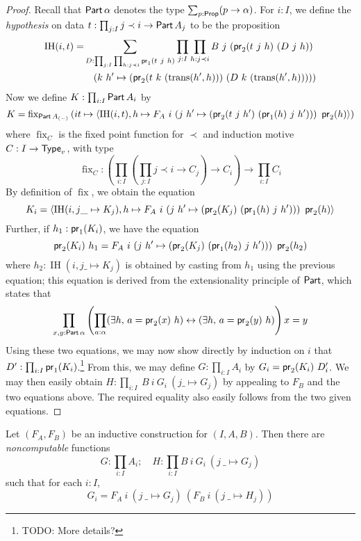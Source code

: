 \begin{proof}
  Recall that \( \operatorname{\mathsf{Part}} \alpha \) denotes the type \( \sum_{p: \mathsf{Prop}} (p \to \alpha) \).
  For \( i : I \), we define the \emph{hypothesis} on data \( t : \prod_{j : I} j \prec i \to \operatorname{\mathsf{Part}} A_j \) to be the proposition
  \begin{align*}
    \operatorname{IH}(i, t) = &\sum_{D : \prod_{j : I} \prod_{h : j \prec i} \pr_1(t\ j\ h)} \prod_{j : I} \prod_{h : j \prec i} B\ j\ (\pr_2(t\ j\ h)\ (D\ j\ h))\\
    &\quad(k\ h' \mapsto (\pr_2(t\ k\ (\operatorname{trans}(h',h)))\ (D\ k\ (\operatorname{trans}(h',h)))))
  \end{align*}
  Now we define \( K : \prod_{i : I} \operatorname{\mathsf{Part}} A_i \) by
  \[ K = \operatorname{fix}_{\Part A_{(-)}} \left( i t \mapsto \left\langle \operatorname{IH}(i, t), h \mapsto F_A\ i\ (j\ h' \mapsto (\pr_2(t\ j\ h')\ (\pr_1(h)\ j\ h')))\ \pr_2(h) \right\rangle \right) \]
  where \( \operatorname{fix}_C \) is the fixed point function for \( \prec \) and induction motive \( C : I \to \mathsf{Type}_v \), with type
  \[ \operatorname{fix}_C : \left( \prod_{i : I} \left( \prod_{j : I} j \prec i \to C_j \right) \to C_i \right) \to \prod_{i : I} C_i \]
  By definition of \( \operatorname{fix} \), we obtain the equation
  \[ K_i = \left\langle \operatorname{IH}(i, j \_ \mapsto K_j), h \mapsto F_A\ i\ (j\ h' \mapsto (\operatorname{\mathsf{pr}}_2(K_j)\ (\operatorname{\mathsf{pr}}_1(h)\ j\ h')))\ \operatorname{\mathsf{pr}}_2(h) \right\rangle \]
  Further, if \( h_1 : \operatorname{\mathsf{pr}}_1(K_i) \), we have the equation
  \[ \pr_2(K_i)\ h_1 = F_A\ i\ (j\ h' \mapsto (\pr_2(K_j)\ (\pr_1(h_2)\ j\ h')))\ \pr_2(h_2) \]
  where \( h_2 : \operatorname{IH}(i, j \_ \mapsto K_j) \) is obtained by casting from \( h_1 \) using the previous equation; this equation is derived from the extensionality principle of \( \operatorname{\mathsf{Part}} \), which states that
  \[ \prod_{x, y : \operatorname{\mathsf{Part}} \alpha} \left( \prod_{a : \alpha} (\exists h,\, a = \operatorname{\mathsf{pr}}_2(x)\ h) \leftrightarrow (\exists h,\, a = \operatorname{\mathsf{pr}}_2(y)\ h) \right) x = y \]
  Using these two equations, we may now show directly by induction on \( i \) that \( D' : \prod_{i : I} \operatorname{\mathsf{pr}}_1(K_i) \).\footnote{TODO: More details?}
  From this, we may define \( G : \prod_{i : I} A_i \) by \( G_i = \operatorname{\mathsf{pr}}_2(K_i)\ D'_i \).
  We may then easily obtain \( H : \prod_{i : I}\ B\ i\ G_i\ (j \_ \mapsto G_j) \) by appealing to \( F_B \) and the two equations above.
  The required equality also easily follows from the two given equations.
\end{proof}
\begin{theorem}
  \label{prop:IC.fix}
  Let \( (F_A, F_B) \) be an inductive construction for \( (I, A, B) \).
  Then there are \emph{noncomputable} functions
  \[ G : \prod_{i : I} A_i;\quad H : \prod_{i : I} B\ i\ G_i\ (j\ \_ \mapsto G_j) \]
  such that for each \( i : I \),
  \[ G_i = F_A\ i\ (j\ \_ \mapsto G_j)\ (F_B\ i\ (j\ \_ \mapsto H_j)) \]
\end{theorem}
